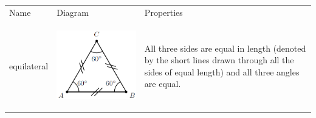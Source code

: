         \begin{center}
      \label{m39368*uid39}
    \noindent
      \tablelasttail{}
      \begin{xtabular*}{\mytablewidth}[t]{|p{10\mystarwidth}|p{10\mystarwidth}|p{10\mystarwidth}|}\hline
        Name &
        Diagram &
        Properties%
     \tabularnewline{}
        equilateral &
    \setcounter{subfigure}{0}
\label{m39368*id317558}
    \begin{center}
    \label{m39368*id317558!!!underscore!!!media}\label{m39368*id317558!!!underscore!!!printimage}\includegraphics[width=.2\columnwidth]{col11306.imgs/m39368_MG10C13_023.png} %
      \vspace{2pt}
    \vspace{.1in}
    \end{center}    
                 &
        All three sides are equal in length (denoted by the short lines drawn through all the sides of equal length) and all three angles are equal.%

\end{xtabular*}
\end{center}
